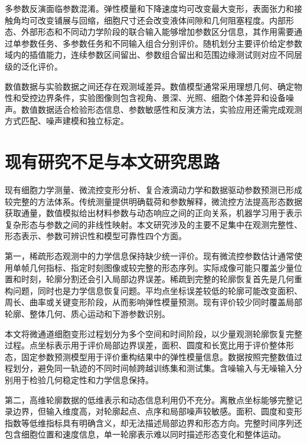 多参数反演面临参数混淆。弹性模量和下降速度均可改变最大变形，表面张力和接触角均可改变铺展与回缩，细胞尺寸还会改变液体间隙和几何阻塞程度。内部形态、外部形态和不同动力学阶段的联合输入能够增加参数区分信息，其作用需要通过单参数任务、多参数任务和不同输入组合分别评价\cite{raue2009identifiability}。随机划分主要评价给定参数域内的插值能力，连续参数区间留出、参数组合留出和范围边缘测试则对应不同层级的泛化评价\cite{roberts2017crossvalidation}。

数值数据与实验数据之间还存在观测域差异。数值模型通常采用理想几何、确定物性和受控边界条件，实验图像则包含视角、景深、光照、细胞个体差异和设备噪声。数值数据适合检验形态信息、参数敏感性和反演方法，实验应用还需完成观测方式匹配、噪声建模和独立标定\cite{karniadakis2021piml,ovadia2019uncertainty}。

\section{现有研究不足与本文研究思路}

现有细胞力学测量、微流控变形分析、复合液滴动力学和数据驱动参数预测已形成较完整的方法体系。传统测量提供明确载荷和参数解释，微流控方法提高形态数据获取通量，数值模拟给出材料参数与动态响应之间的正向关系，机器学习用于表示复杂形态与参数之间的非线性映射。本文研究涉及的主要不足集中在观测完整性、形态表示、参数可辨识性和模型可靠性四个方面。

第一，稀疏形态观测中的力学信息保持缺少统一评价。现有微流控参数估计通常使用单帧几何指标、指定时刻图像或较完整的形态序列。实际成像可能只覆盖少量位置和时刻，轮廓分割还会引入局部边界误差。稀疏到完整的轮廓恢复首先是几何重构问题，同时也是力学信息恢复问题。平均点坐标误差较低的轮廓可能改变面积、周长、曲率或关键变形阶段，从而影响弹性模量预测。现有评价较少同时覆盖局部轮廓、整体几何、质心运动和下游参数识别。

本文将微通道细胞变形过程划分为多个空间和时间阶段，以少量观测轮廓恢复完整过程。点坐标表示用于评价局部边界误差，面积、圆度和长宽比用于评价整体形态，固定参数预测模型用于评价重构结果中的弹性模量信息。数据按照完整数值过程划分，避免同一轨迹的不同时间帧跨越训练集和测试集。含噪输入与无噪输入分别用于检验几何稳定性和力学信息保持。

第二，高维轮廓数据的低维表示和动态信息利用仍不充分。离散点坐标能够完整记录边界，但输入维度高，对轮廓起点、点序和局部噪声较敏感。面积、圆度和变形指数等低维指标具有明确含义，却无法描述局部边界和形态方向。完整时间序列还包含细胞位置和速度信息，单一轮廓表示难以同时描述形态变化和整体运动。


